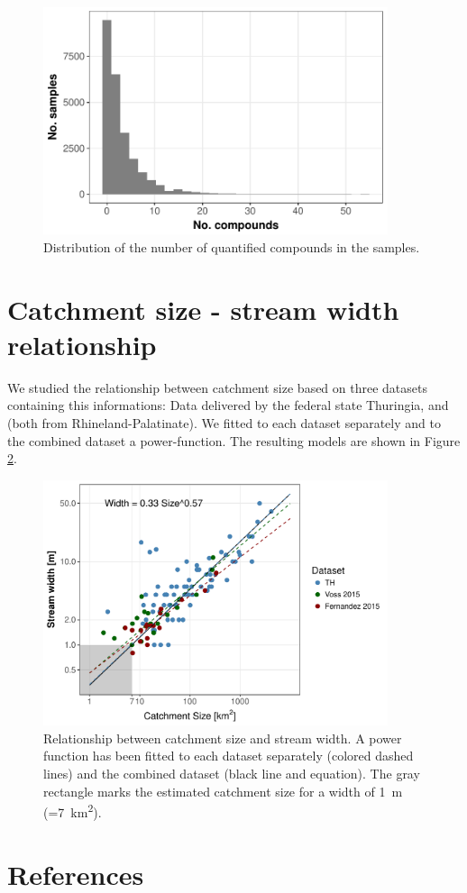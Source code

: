 \begin{figure}[ht]
	\centering
	\includegraphics[width = 0.9\textwidth]{appendix/smallstreams/one/pmix}
	\caption{Distribution of the number of quantified compounds in the samples.}
	\label{fig:pmix}
\end{figure}


\clearpage
\section{Catchment size - stream width relationship}
We studied the relationship between catchment size based on three datasets containing this informations:
Data delivered by the federal state Thuringia, \citet{vos_organic_2015} and \citet{fernandez_effects_2015} (both from Rhineland-Palatinate).
We fitted to each dataset separately and to the combined dataset a power-function.
The resulting models are shown in Figure \ref{fig:size_width}. 

\begin{figure}[ht]
	\centering
	\includegraphics[width = 0.9\textwidth]{appendix/smallstreams/one/width_size}
		\caption[Relationship between catchment size and stream width.]{Relationship between catchment size and stream width. A power function has been fitted to each dataset separately (colored dashed lines) and the combined dataset (black line and equation). The gray rectangle marks the estimated catchment size for a width of 1~m (=7~km\textsuperscript{2}). }
	\label{fig:size_width}
\end{figure}

\clearpage
\section{References}
\printbibliography[heading=none]
